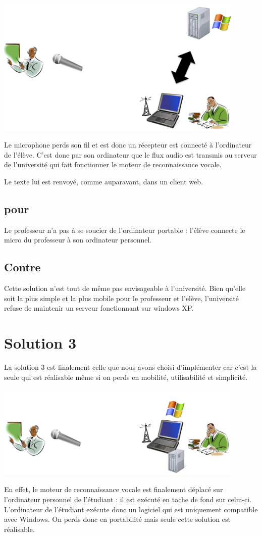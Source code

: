\includegraphics[width=12cm]{img/solution2.png} 


Le microphone perds son fil et est donc un récepteur est connecté à l'ordinateur de l'élève.
C'est donc par son ordinateur que le flux audio est transmis au serveur de l'université qui fait fonctionner le moteur de reconnaissance vocale.

Le texte lui est renvoyé, comme auparavant, dans un client web.

\subsection{pour}
Le professeur n'a pas à se soucier de l'ordinateur portable : l'élève connecte le micro du professeur à son ordinateur personnel.

\subsection{Contre}
Cette solution n'est tout de même pas envisageable à l'université. Bien qu'elle soit la plus simple et la plus mobile pour le professeur et l'elève, l'université refuse de maintenir un serveur fonctionnant sur windows XP.

\section{Solution 3}
La solution 3 est finalement celle que nous avons choisi d'implémenter car c'est la seule qui est réalisable même si on perds en mobilité, utilisabilité et simplicité.

\includegraphics[width=12cm]{img/solution3.png} 

En effet, le moteur de reconnaissance vocale est finalement déplacé sur l'ordinateur personnel de l'étudiant : il est exécuté en tache de fond sur celui-ci. L'ordinateur de l'étudiant exécute donc un logiciel qui est uniquement compatible avec Windows. On perds donc en portabilité mais seule cette solution est réalisable.
